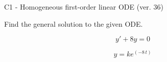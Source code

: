 \begin{exercise}
  \begin{exerciseTitle}C1 - Homogeneous first-order linear ODE (ver. 36)\end{exerciseTitle}
  \begin{exerciseStatement}
    
Find the general solution to the given ODE.

    
\[y'+8y=0\]

  \end{exerciseStatement}
  \begin{exerciseAnswer}
    
\[y= k e^{\left(-8 \, t\right)}\]

  \end{exerciseAnswer}
\end{exercise}